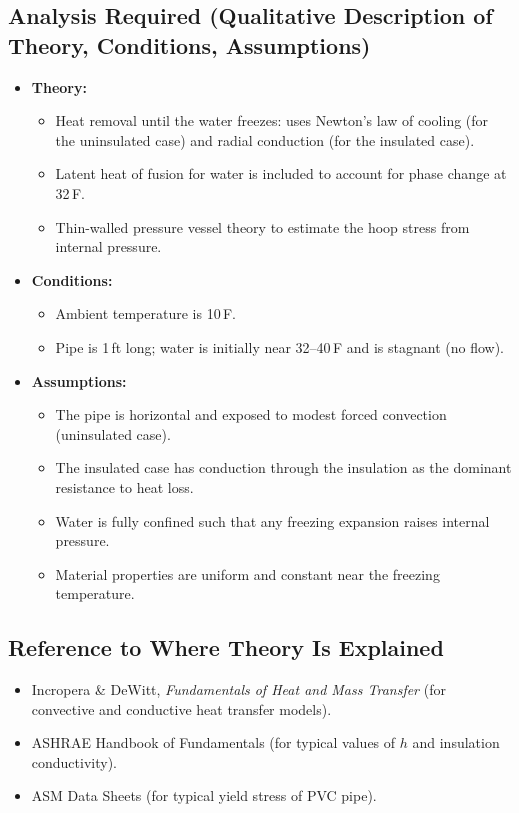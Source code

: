 \documentclass[12pt]{report}
\begin{document}
\subsection{Analysis Required (Qualitative Description of Theory, Conditions, Assumptions)}
\begin{itemize}
    \item \textbf{Theory:} 
    \begin{itemize}
        \item Heat removal until the water freezes: uses Newton's law of cooling (for the uninsulated case) and radial conduction (for the insulated case).
        \item Latent heat of fusion for water is included to account for phase change at 32\,\textdegree F.
        \item Thin-walled pressure vessel theory to estimate the hoop stress from internal pressure.
    \end{itemize}
    \item \textbf{Conditions:}
    \begin{itemize}
        \item Ambient temperature is 10\,\textdegree F.
        \item Pipe is 1\,ft long; water is initially near 32--40\,\textdegree F and is stagnant (no flow).
    \end{itemize}
    \item \textbf{Assumptions:}
    \begin{itemize}
        \item The pipe is horizontal and exposed to modest forced convection (uninsulated case).
        \item The insulated case has conduction through the insulation as the dominant resistance to heat loss.
        \item Water is fully confined such that any freezing expansion raises internal pressure.
        \item Material properties are uniform and constant near the freezing temperature.
    \end{itemize}
\end{itemize}

\subsection{Reference to Where Theory Is Explained}
\begin{itemize}
    \item Incropera \& DeWitt, \emph{Fundamentals of Heat and Mass Transfer} (for convective and conductive heat transfer models).
    \item ASHRAE Handbook of Fundamentals (for typical values of $h$ and insulation conductivity).
    \item ASM Data Sheets (for typical yield stress of PVC pipe).
\end{itemize}
\end{document}

